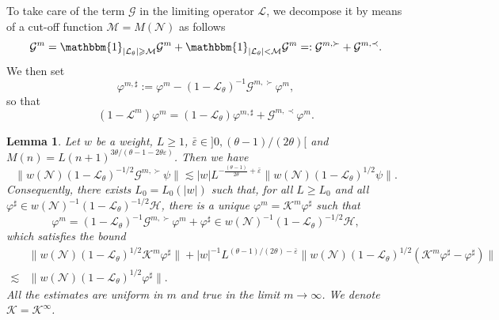 \documentclass[10pt]{article}
\newcommand{\assign}{:=}
\newcommand{\backassign}{=:}
\newtheorem{lemma}{Lemma}
\begin{document}
To take care of the term $\mathcal{G}$ in the limiting operator $\mathcal{L}$,
we decompose it by means of a cut-off function $\mathcal{M}= M (\mathcal{N})$
as follows
\[ \mathcal{G}^m = \mathbbm{1}_{| \mathcal{L}_{\theta} | \geqslant
   \mathcal{M}} \mathcal{G}^m + \mathbbm{1}_{| \mathcal{L}_{\theta} |
   <\mathcal{M}} \mathcal{G}^m \backassign \mathcal{G}^{m, \succ}
   +\mathcal{G}^{m, \prec} . \]
We then set
\begin{equation}
  \varphi^{m, \sharp} \assign \varphi^m - (1 -\mathcal{L}_{\theta})^{- 1}
  \mathcal{G}^{m, \succ} \varphi^m, \label{eq:phimsharp}
\end{equation}
so that
\begin{equation}
  (1 -\mathcal{L}^m) \varphi^m = (1 -\mathcal{L}_{\theta}) \varphi^{m, \sharp}
  +\mathcal{G}^{m, \prec} \varphi^m . \label{eq:act-Lm}
\end{equation}
\begin{lemma}
  \label{lem:exist-controlled}Let $w$ be a weight, $L \geqslant 1$,
  $\bar{\varepsilon} \in] 0, (\theta - 1) / (2 \theta) [$ and $M (n) = L (n +
  1)^{3 \theta / (\theta - 1 - 2 \theta \varepsilon)}$. Then we have
  \begin{equation}
    \| w (\mathcal{N}) (1 -\mathcal{L}_{\theta})^{- 1 / 2} \mathcal{G}^{m,
    \succ} \psi \| \lesssim | w | L^{- \frac{(\theta - 1)}{2 \theta} +
    \bar{\varepsilon}} \| w (\mathcal{N}) (1 -\mathcal{L}_{\theta})^{1 / 2}
    \psi \| . \label{eq:est-G-maj}
  \end{equation}
  Consequently, there exists $L_0 = L_0 (| w |)$ such that, for all $L
  \geqslant L_0$ and all $\varphi^{\sharp} \in w (\mathcal{N})^{- 1} (1
  -\mathcal{L}_{\theta})^{- 1 / 2} \mathcal{H}$, there is a unique $\varphi^m
  =\mathcal{K}^m \varphi^{\sharp}$ such that
  \[ \varphi^m = (1 -\mathcal{L}_{\theta})^{- 1} \mathcal{G}^{m, \succ}
     \varphi^m + \varphi^{\sharp} \in w (\mathcal{N})^{- 1} (1
     -\mathcal{L}_{\theta})^{- 1 / 2} \mathcal{H}, \]
  which satisfies the bound
  \begin{equation}
    \begin{array}{ll}
      & \| w (\mathcal{N}) (1 -\mathcal{L}_{\theta})^{1 / 2} \mathcal{K}^m
      \varphi^{\sharp} \| + | w |^{- 1} L^{(\theta - 1) / (2 \theta) -
      \bar{\varepsilon}} \| w (\mathcal{N}) (1 -\mathcal{L}_{\theta})^{1 / 2}
      (\mathcal{K}^m \varphi^{\sharp} - \varphi^{\sharp}) \|\\
      \lesssim & \| w (\mathcal{N}) (1 -\mathcal{L}_{\theta})^{1 / 2}
      \varphi^{\sharp} \| .
    \end{array} \label{eq:controlled-est}
  \end{equation}
  All the estimates are uniform in $m$ and true in the limit $m \rightarrow
  \infty$. We denote $\mathcal{K}=\mathcal{K}^{\infty}$.
\end{lemma}
\end{document}
